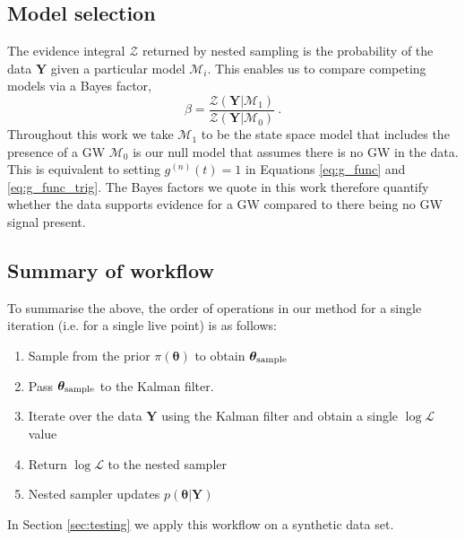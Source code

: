 \documentclass[fleqn,usenatbib,useAMS]{mnras}
\begin{document}

\subsection{Model selection}\label{sec:model_selection}
The evidence integral $\mathcal{Z}$ returned by nested sampling is the probability of the data $\boldsymbol{Y}$ given a particular model $\mathcal{M}_i$. This enables us to compare competing models via a Bayes factor,
\begin{equation}
	\beta = \frac{\mathcal{Z}(\boldsymbol{Y} | \mathcal{M}_1)}{\mathcal{Z}(\boldsymbol{Y} | \mathcal{M}_0)} \ . \label{eq:bayes}
\end{equation}
Throughout this work we take $\mathcal{M}_1$ to be the state space model that includes the presence of a GW $\mathcal{M}_0$ is our null model that assumes there is no GW in the data. This is equivalent to setting $g^{(n)}(t)=1$ in Equations \eqref{eq:g_func} and \eqref{eq:g_func_trig}. The Bayes factors we quote in this work therefore quantify whether the data supports evidence for a GW compared to there being no GW signal present.


\subsection{Summary of workflow}\label{sec:methodsummary}
To summarise the above, the order of operations in our method for a single iteration (i.e. for a single live point) is as follows:
\begin{enumerate}
	\item Sample from the prior $\pi(\boldsymbol{\theta})$ to obtain $\boldsymbol{\theta}_{\rm sample}$
    \item Pass $\boldsymbol{\theta}_{\rm sample}$ to the Kalman filter.
	\item Iterate over the data $\boldsymbol{Y}$ using the Kalman filter and obtain a single $\log \mathcal{L}$ value
	\item Return $\log \mathcal{L}$ to the nested sampler
    \item Nested sampler updates $p\left(\boldsymbol{\theta}|\boldsymbol{Y}\right)$
\end{enumerate}
In Section \ref{sec:testing} we apply this workflow on a synthetic data set.
\end{document}
